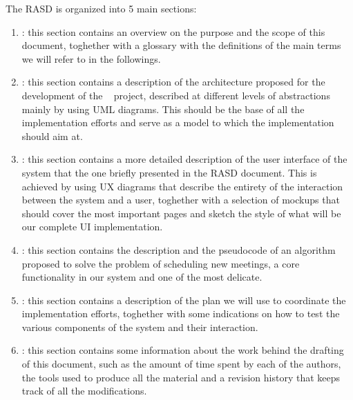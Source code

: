 The RASD is organized into 5 main sections:

\begin{enumerate}
\item {\textbf{}}: this section contains an overview on the purpose and the scope of this document, toghether with a glossary with the definitions of the main terms we will refer to in the followings.
\item {\textbf{}}: this section contains a description of the architecture proposed for the development of the \projectname~ project, described at different levels of abstractions mainly by using UML diagrams. This should be the base of all the implementation efforts and serve as a model to which the implementation should aim at.
\item {\textbf{}}: this section contains a more detailed description of the user interface of the system that the one briefly presented in the RASD document. This is achieved by using UX diagrams that describe the entirety of the interaction between the system and a user, toghether with a selection of mockups that should cover the most important pages and sketch the style of what will be our complete UI implementation.
\item {\textbf{}}: this section contains the description and the pseudocode of an algorithm proposed to solve the problem of scheduling new meetings, a core functionality in our system and one of the most delicate.
\item {\textbf{}}: this section contains a description of the plan we will use to coordinate the implementation efforts, toghether with some indications on how to test the various components of the system and their interaction.
\item {\textbf{}}: this section contains some information about the work behind the drafting of this
document, such as the amount of time spent by each of the authors, the tools used to produce all
the material and a revision history that keeps track of all the modifications.
\end{enumerate}